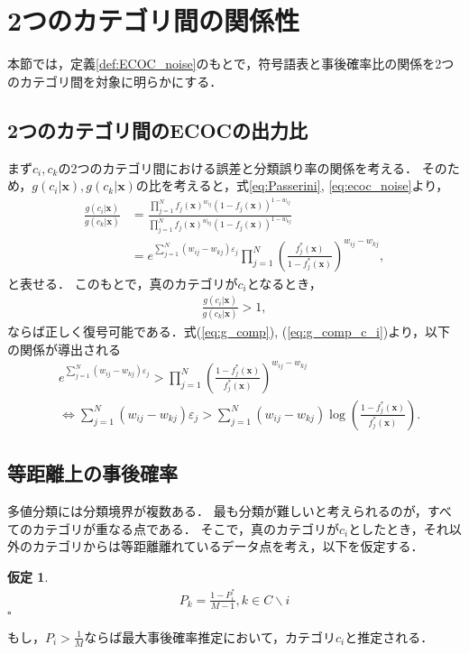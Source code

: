 \documentclass{jarticle}
\theoremstyle{definition}
\newtheorem{assumption}{仮定}
\def\QED{\hfill$\square$}
\begin{document}
\section{2つのカテゴリ間の関係性}
本節では，定義\ref{def:ECOC_noise}のもとで，符号語表と事後確率比の関係を2つのカテゴリ間を対象に明らかにする．

\subsection{2つのカテゴリ間のECOCの出力比}
まず$c_i,c_k$の2つのカテゴリ間における誤差と分類誤り率の関係を考える．
そのため，$g(c_i|\bm{x}),g(c_k|\bm{x})$の比を考えると，式\eqref{eq:Passerini}, \eqref{eq:ecoc_noise}より，
\begin{align}\label{eq:g_comp}
    \frac{g(c_i|\bm{x})}{g(c_k|\bm{x})} &= \frac{\prod_{j = 1}^N f_j(\bm{x})^{w_{ij}}(1-f_j(\bm{x}))^{1 - w_{ij}}}{\prod_{j = 1}^N f_j(\bm{x})^{w_{kj}}(1-f_j(\bm{x}))^{1 - w_{kj}}}\nonumber\\
     &= e^{\sum_{j = 1}^N (w_{ij} - w_{kj})\varepsilon_j}\prod_{j = 1}^N\left(\frac{f^*_j(\bm{x})}{1-f^*_j(\bm{x})}\right)^{w_{ij} - w_{kj}},
\end{align}
と表せる．
このもとで，真のカテゴリが$c_i$となるとき，
\begin{align}\label{eq:g_comp_c_i}
    \frac{g(c_i|\bm{x})}{g(c_k|\bm{x})} > 1,
\end{align}
ならば正しく復号可能である．式(\ref{eq:g_comp}), (\ref{eq:g_comp_c_i})より，以下の関係が導出される
\begin{align}\label{eq:g_comp_cond}
&e^{\sum_{j = 1}^N (w_{ij} - w_{kj})\varepsilon_j}>\prod_{j = 1}^N\left(\frac{1-f^*_j(\bm{x})}{f^*_j(\bm{x})}\right)^{w_{ij} - w_{kj}}\nonumber\\
& \Leftrightarrow \sum_{j = 1}^N (w_{ij} - w_{kj})\varepsilon_j > \sum_{j = 1}^N (w_{ij} - w_{kj}) \log\left(\frac{1-f^*_j(\bm{x})}{f^*_j(\bm{x})}\right).
\end{align}

\subsection{等距離上の事後確率}
多値分類には分類境界が複数ある．
最も分類が難しいと考えられるのが，すべてのカテゴリが重なる点である．
そこで，真のカテゴリが$c_i$としたとき，それ以外のカテゴリからは等距離離れているデータ点を考え，以下を仮定する．
\begin{assumption}\label{ass:P_i}
\begin{align}\label{eq:P_i_alpha}
P_k = \frac{1 - P^*_i}{M - 1}, k \in C \backslash i
\end{align}
\QED \end{assumption} 
もし，$P_i>\frac{1}{M}$ならば最大事後確率推定において，カテゴリ$c_i$と推定される．
\end{document}
